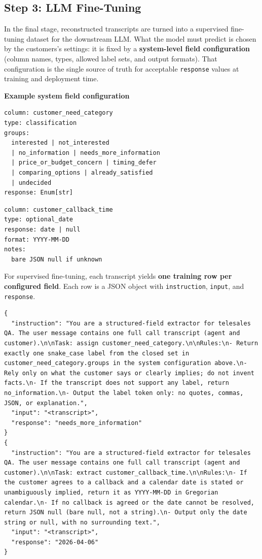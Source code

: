 \documentclass[ 
  journal=medium,
  manuscript={Contextual Information Extraction of Customer Data from Sales audio calls},
  year=2026,
  volume=0,
]{cup-journal}
\begin{document}
\subsection{Step 3: LLM Fine-Tuning}
In the final stage, reconstructed transcripts are turned into a supervised fine-tuning dataset for the downstream LLM.
What the model must predict is chosen by the customers's settings: it is fixed by a \textbf{system-level field configuration} (column names, types, allowed label sets, and output formats).
That configuration is the single source of truth for acceptable \texttt{response} values at training and deployment time.

\noindent\textbf{Example system field configuration}\par\nobreak
\smallskip\noindent
\begin{minipage}[t]{0.48\linewidth}
\scriptsize
\begin{verbatim}
column: customer_need_category
type: classification
groups:
  interested | not_interested
  | no_information | needs_more_information
  | price_or_budget_concern | timing_defer
  | comparing_options | already_satisfied
  | undecided
response: Enum[str]
\end{verbatim}
\end{minipage}%
\hfill
\begin{minipage}[t]{0.48\linewidth}
\scriptsize
\begin{verbatim}
column: customer_callback_time
type: optional_date
response: date | null
format: YYYY-MM-DD
notes:
  bare JSON null if unknown
\end{verbatim} 
\end{minipage}

For supervised fine-tuning, each transcript yields \textbf{one training row per configured field}.
Each row is a JSON object with \texttt{instruction}, \texttt{input}, and \texttt{response}.

\begin{Verbatim}
{
  "instruction": "You are a structured-field extractor for telesales QA. The user message contains one full call transcript (agent and customer).\n\nTask: assign customer_need_category.\n\nRules:\n- Return exactly one snake_case label from the closed set in customer_need_category.groups in the system configuration above.\n- Rely only on what the customer says or clearly implies; do not invent facts.\n- If the transcript does not support any label, return no_information.\n- Output the label token only: no quotes, commas, JSON, or explanation.",
  "input": "<transcript>",
  "response": "needs_more_information"
}
{
  "instruction": "You are a structured-field extractor for telesales QA. The user message contains one full call transcript (agent and customer).\n\nTask: extract customer_callback_time.\n\nRules:\n- If the customer agrees to a callback and a calendar date is stated or unambiguously implied, return it as YYYY-MM-DD in Gregorian calendar.\n- If no callback is agreed or the date cannot be resolved, return JSON null (bare null, not a string).\n- Output only the date string or null, with no surrounding text.",
  "input": "<transcript>",
  "response": "2026-04-06"
}
\end{Verbatim}
\end{document}
